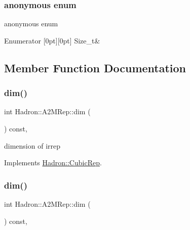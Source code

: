 \subsubsection{\texorpdfstring{anonymous enum}{anonymous enum}}
{\footnotesize\ttfamily anonymous enum}

\begin{DoxyEnumFields}{Enumerator}
[0pt][0pt]{}\mbox{\label{structHadron_1_1A2MRep_af2a2167bbb7b739844e0e0a9ab5bbb4ba7b3ea5f88e442ca6fa38c52bc3f32169}} 
Size\+\_\+t&\\
\hline

\end{DoxyEnumFields}


\subsection{Member Function Documentation}
\mbox{\label{structHadron_1_1A2MRep_a4beb5fe1320c7139fecc080ff29d8f0d}} 
\subsubsection{\texorpdfstring{dim()}{dim()}\hspace{0.1cm}{\footnotesize\ttfamily [1/2]}}
{\footnotesize\ttfamily int Hadron\+::\+A2\+M\+Rep\+::dim (\begin{DoxyParamCaption}{ }\end{DoxyParamCaption}) const\hspace{0.3cm}{\ttfamily [inline]}, {\ttfamily [virtual]}}

dimension of irrep 

Implements \mbox{\hyperlink{structHadron_1_1CubicRep_ac178d14064f037a66af4b9fb4b312d51}{Hadron\+::\+Cubic\+Rep}}.

\mbox{\label{structHadron_1_1A2MRep_a4beb5fe1320c7139fecc080ff29d8f0d}} 
\subsubsection{\texorpdfstring{dim()}{dim()}\hspace{0.1cm}{\footnotesize\ttfamily [2/2]}}
{\footnotesize\ttfamily int Hadron\+::\+A2\+M\+Rep\+::dim (\begin{DoxyParamCaption}{ }\end{DoxyParamCaption}) const\hspace{0.3cm}{\ttfamily [inline]}, {\ttfamily [virtual]}}

